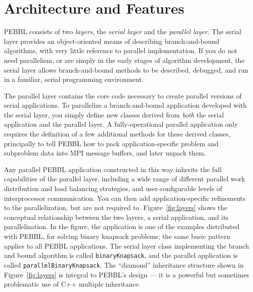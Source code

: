 \section{Architecture and Features}
\label{sec:arch}

PEBBL consists of two \emph{layers}, the \emph{serial layer} and the
\emph{parallel layer}.  The serial layer provides an object-oriented
means of describing branch-and-bound algorithms, with very little
reference to parallel implementation.  If you do not need parallelism,
or are simply in the early stages of algorithm development, the serial
layer allows branch-and-bound methods to be described, debugged, and
run in a familiar, serial programming environment.

The parallel layer contains the core code necessary to create parallel
versions of serial applications.  To parallelize a branch-and-bound
application developed with the serial layer, you simply define
new classes derived from \emph{both} the serial application and the parallel
layer.  A fully-operational parallel application only requires the
definition of a few additional methods for these derived classes,
principally to tell PEBBL how to pack application-specific problem and
subproblem data into MPI message buffers, and later unpack them.

Any parallel PEBBL application constructed in this way inherits the
full capabilities of the parallel layer, including a wide range of
different parallel work distribution and load balancing strategies,
and user-configurable levels of interprocessor communication.  You can
then add application-specific refinements to the parallelization, but
are not required to. Figure~\ref{fig:layers} shows the conceptual
relationship between the two layers, a serial application, and its
parallelization.  In the figure, the application is one of the
examples distributed with PEBBL, for solving binary knapsack problems;
the same basic pattern applies to all PEBBL applications.  The serial
layer class implementing the branch and bound algorithm is called
\texttt{binaryKnapsack}, and the parallel application is called
\texttt{parallelBinaryKnapsack}.  The ``diamond'' inheritance
structure shown in Figure~\ref{fig:layers} is integral to PEBBL's
design --- it is a powerful but sometimes problematic use of C++
multiple inheritance.

